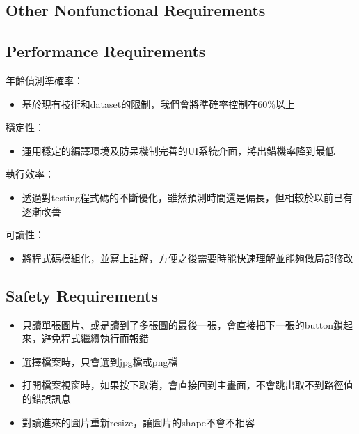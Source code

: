 \documentclass{scrreprt}
\begin{document}
\begin{CJK}{UTF8}{bkai}
\chapter{Other Nonfunctional Requirements}

\section{Performance Requirements}
年齡偵測準確率：
    \begin{itemize}
	    \item 基於現有技術和dataset的限制，我們會將準確率控制在60\%以上
    \end{itemize}
穩定性：
    \begin{itemize}
	    \item 運用穩定的編譯環境及防呆機制完善的UI系統介面，將出錯機率降到最低
    \end{itemize}
執行效率：
    \begin{itemize}
	    \item 透過對testing程式碼的不斷優化，雖然預測時間還是偏長，但相較於以前已有逐漸改善
    \end{itemize}
可讀性：
    \begin{itemize}
	    \item 將程式碼模組化，並寫上註解，方便之後需要時能快速理解並能夠做局部修改
    \end{itemize}


\section{Safety Requirements}
    \begin{itemize}
	    \item 只讀單張圖片、或是讀到了多張圖的最後一張，會直接把下一張的button鎖起來，避免程式繼續執行而報錯
	    \item 選擇檔案時，只會選到jpg檔或png檔
	    \item 打開檔案視窗時，如果按下取消，會直接回到主畫面，不會跳出取不到路徑值的錯誤訊息
	    \item 對讀進來的圖片重新resize，讓圖片的shape不會不相容
    \end{itemize}

\end{CJK}
\end{document}

